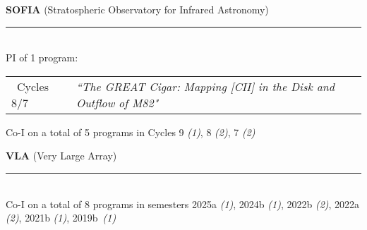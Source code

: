 \documentclass[11pt]{article}
\makeatletter
\def\vhrulefill#1{\leavevmode\leaders\hrule\@height#1\hfill \kern\z@}
\makeatother
\begin{document}

{\bf SOFIA} {\small (Stratospheric Observatory for Infrared Astronomy)} \vhrulefill{0.5pt}\\
{PI of 1 program:}
\vspace{-9pt}
\begin{longtable}{p{}p{}}
\ Cycles 8/7 & \textit{``The GREAT Cigar: Mapping [CII] in the Disk and Outflow of M82"}\\
\end{longtable}
\vspace{-18pt}
Co-I on a total of 5 programs in Cycles 9 {\em(1)}, 8 {\em(2)}, 7 {\em(2)}


{\bf VLA} {\small (Very Large Array)} \vhrulefill{0.5pt}\\
Co-I on a total of 8 programs in semesters 2025a {\em(1)}, 2024b {\em(1)}, 2022b {\em(2)}, 2022a {\em(2)}, 2021b {\em(1)}, 2019b~{\em(1)}\smallskip
\end{document}
